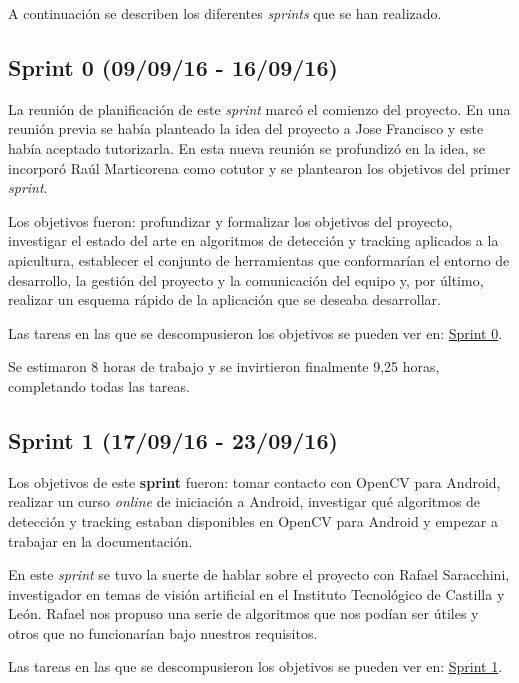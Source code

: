 A continuación se describen los diferentes \emph{sprints} que se han
realizado.

\subsection{Sprint 0 (09/09/16 -
16/09/16)}\label{sprint-0-090916---160916}

La reunión de planificación de este \emph{sprint} marcó el comienzo del
proyecto. En una reunión previa se había planteado la idea del proyecto
a Jose Francisco y este había aceptado tutorizarla. En esta nueva
reunión se profundizó en la idea, se incorporó Raúl Marticorena como
cotutor y se plantearon los objetivos del primer \emph{sprint}.

Los objetivos fueron: profundizar y formalizar los objetivos del
proyecto, investigar el estado del arte en algoritmos de detección y
tracking aplicados a la apicultura, establecer el conjunto de
herramientas que conformarían el entorno de desarrollo, la gestión del
proyecto y la comunicación del equipo y, por último, realizar un esquema
rápido de la aplicación que se deseaba desarrollar.

Las tareas en las que se descompusieron los objetivos se pueden ver en:
\href{https://github.com/davidmigloz/go-bees/milestone/1?closed=1}{Sprint
0}.

Se estimaron 8 horas de trabajo y se invirtieron finalmente 9,25 horas,
completando todas las tareas.


\subsection{Sprint 1 (17/09/16 -
23/09/16)}\label{sprint-1-170916---230916}

Los objetivos de este \textbf{sprint} fueron: tomar contacto con OpenCV
para Android, realizar un curso \emph{online} de iniciación a Android,
investigar qué algoritmos de detección y tracking estaban disponibles en
OpenCV para Android y empezar a trabajar en la documentación.

En este \emph{sprint} se tuvo la suerte de hablar sobre el proyecto con
Rafael Saracchini, investigador en temas de visión artificial en el
Instituto Tecnológico de Castilla y León. Rafael nos propuso una serie
de algoritmos que nos podían ser útiles y otros que no funcionarían bajo
nuestros requisitos.

Las tareas en las que se descompusieron los objetivos se pueden ver en:
\href{https://github.com/davidmigloz/go-bees/milestone/2?closed=1}{Sprint
1}.

